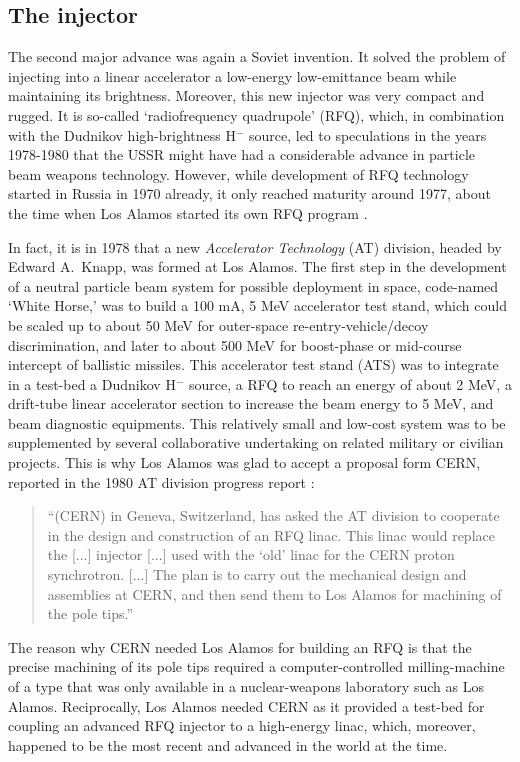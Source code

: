 \documentclass [12pt,a4paper,     ]{report} %
\begin{document}
\subsection{The injector}

The second major advance was again a Soviet invention. It solved the problem of injecting into a linear accelerator a low-energy low-emittance beam while maintaining its brightness.  Moreover, this new injector was very compact and rugged.  It is so-called `radiofrequency quadrupole' (RFQ), which, in combination with the Dudnikov high-brightness H$^-$ source, led to speculations in the years 1978-1980 that the USSR might have had a considerable advance in particle beam weapons technology.  However, while development of RFQ technology started in Russia in 1970 already, it only reached maturity around 1977, about the time when Los Alamos started its own RFQ program \cite{WELLS1985-}.

In fact, it is in 1978 that a new \emph{Accelerator Technology} (AT) division, headed by Edward A.\ Knapp, was formed at Los Alamos. The first step in the development of a neutral particle beam system for possible deployment in space, code-named `White Horse,' was to build a 100 mA, 5 MeV accelerator test stand, which could be scaled up to about 50 MeV for outer-space re-entry-vehicle/decoy discrimination, and later to about 500 MeV for boost-phase or mid-course intercept of ballistic missiles. This accelerator test stand (ATS) was to integrate in a test-bed a Dudnikov H$^-$ source, a RFQ to reach an energy of about 2 MeV, a drift-tube linear accelerator section to increase the beam energy to 5 MeV, and beam diagnostic equipments.  This relatively small and low-cost system was to be supplemented by several collaborative undertaking on related military or civilian projects.  This is why Los Alamos was glad to accept a proposal form CERN, reported in the 1980 AT division progress report \cite[p.36]{KNAPP1982-}:

\begin{quote}
``(CERN) in Geneva, Switzerland, has asked the AT division to cooperate in the design and construction of an RFQ linac.  This linac would replace the [...] injector [...] used with the `old' linac for the CERN proton synchrotron. [...] The plan is to carry out the mechanical design and assemblies at CERN, and then send them to Los Alamos for machining of the pole tips.''
\end{quote} 

The reason why CERN needed Los Alamos for building an RFQ is that the precise machining of its pole tips required a computer-controlled milling-machine of a type that was only available in a nuclear-weapons laboratory such as Los Alamos.  Reciprocally, Los Alamos needed CERN as it provided a test-bed for coupling an advanced RFQ injector to a high-energy linac, which, moreover, happened to be the most recent and advanced in the world at the time.
\end{document}
